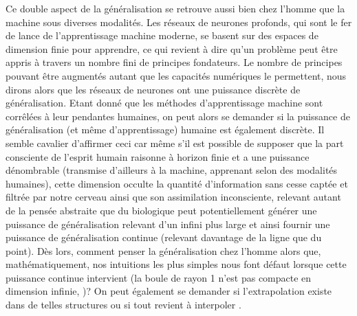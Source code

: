      Ce double aspect de la généralisation se retrouve aussi bien chez l'homme que la machine sous diverses modalités. Les réseaux de neurones profonds, qui sont le fer de lance de l'apprentissage machine moderne, se basent sur des espaces de dimension finie pour apprendre, ce qui revient à dire qu'un problème peut être appris à travers un nombre fini de principes fondateurs. Le nombre de principes pouvant être augmentés autant que les capacités numériques le permettent, nous dirons alors que les réseaux de neurones ont une puissance discrète de généralisation. Etant donné que les méthodes d'apprentissage machine sont corrêlées à leur pendantes humaines, on peut alors se demander si la puissance de généralisation (et même d'apprentissage) humaine est également discrète. Il semble cavalier d'affirmer ceci car même s'il est possible de supposer que la part consciente de l'esprit humain raisonne à horizon finie et a une puissance dénombrable (transmise d'ailleurs à la machine, apprenant selon des modalités humaines), cette dimension occulte la quantité d'information  sans cesse captée et filtrée par notre cerveau ainsi que son assimilation inconsciente, relevant autant de la pensée abstraite que du biologique peut potentiellement générer une puissance de généralisation relevant d'un infini plus large et ainsi fournir une puissance de généralisation continue (relevant davantage de la ligne que du point). Dès lors, comment penser la généralisation chez l'homme alors que, mathématiquement, nos intuitions les plus simples nous font défaut lorsque cette puissance continue intervient (la boule de rayon 1 n'est pas compacte en dimension infinie, \citealp{riesz1955lecons})? On peut également se demander si l'extrapolation existe dans de telles structures ou si tout revient à interpoler \citep{hasson2020direct}.
    
